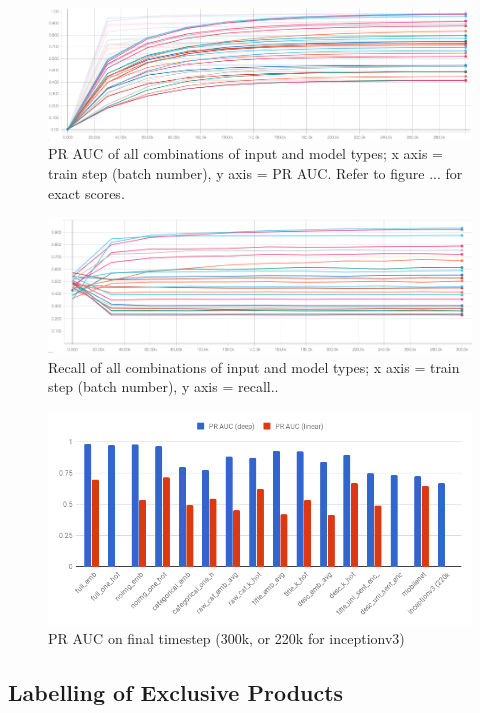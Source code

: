 \begin{figure}
  \includegraphics[width=\linewidth]{figures/pr_auc_all}
  \caption{PR AUC of all combinations of input and model types; x axis = train step (batch number), y axis = PR AUC. Refer to figure ... for exact scores.}
  \label{pr_auc_all}
\end{figure}
\begin{figure}
  \includegraphics[width=\linewidth]{figures/recall_all}
  \caption{Recall of all combinations of input and model types; x axis = train step (batch number), y axis = recall..}
  \label{recall_all}
\end{figure}

\begin{figure}
  \includegraphics[width=\linewidth]{figures/pr_auc_chart}
  \caption{PR AUC on final timestep (300k, or 220k for inceptionv3)}
  \label{pr_auc_chart}
\end{figure}

\subsection{Labelling of Exclusive Products}
\label{labex}

